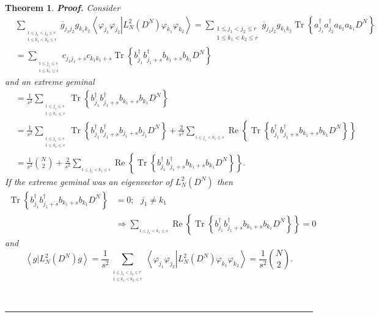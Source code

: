 \documentclass[aps,preprint]{revtex4}%
\newtheorem{theorem}{Theorem}
\newenvironment{proof}[1][Proof]{\noindent\textbf{#1.} }{\ \rule{0.5em}{0.5em}}
\begin{document}
\begin{theorem}
\begin{proof}
Consider
\begin{align}
&  \sum_{_{\substack{1\leq j_{1}<j_{2}\leq r\\1\leq k_{1}<k_{2}\leq r}%
}}\overline{g}_{j_{1}j_{2}}g_{k_{1}k_{2}}\left\langle \left.  \varphi_{j_{1}%
}\varphi_{j_{2}}\right\vert L_{N}^{2}\left(  D^{N}\right)  \varphi_{k_{1}%
}\varphi_{k_{2}}\right\rangle =\sum_{\substack{1\leq j_{1}<j_{2}\leq r\\1\leq
k_{1}<k_{2}\leq r}}\overline{g}_{j_{1}j_{2}}g_{k_{1}k_{2}}\operatorname{Tr}%
\left\{  a_{j_{1}}^{\dagger}a_{j_{2}}^{\dagger}a_{k_{2}}a_{k_{1}}D^{N}\right\}
\\
&  =\sum_{_{\substack{1\leq j_{1}\leq s\\1\leq k_{1}\leq s}}}c_{j_{1}j_{1}%
+s}c_{k_{1}k_{1}+s}\operatorname{Tr}\left\{  b_{j_{1}}^{\dagger}b_{j_{1}%
+s}^{\dagger}b_{k_{1}+s}b_{k_{1}}D^{N}\right\}
\end{align}
and an extreme geminal
\begin{align}
&  =\frac{1}{s^{2}}\sum_{_{\substack{1\leq j_{1}\leq s\\1\leq k_{1}\leq s}%
}}\operatorname{Tr}\left\{  b_{j_{1}}^{\dagger}b_{j_{1}+s}^{\dagger}%
b_{k_{1}+s}b_{k_{1}}D^{N}\right\} \\
&  =\frac{1}{s^{2}}\sum_{_{\substack{1\leq j_{1}\leq s\\1\leq k_{1}\leq s}%
}}\operatorname{Tr}\left\{  b_{j_{1}}^{\dagger}b_{j_{1}+s}^{\dagger}%
b_{j_{1}+s}b_{j_{1}}D^{N}\right\}  +\frac{2}{s^{2}}\sum_{_{1\leq j_{1}%
<k_{1}\leq s}}\operatorname{Re}\left\{  \operatorname{Tr}\left\{  b_{j_{1}%
}^{\dagger}b_{j_{1}+s}^{\dagger}b_{k_{1}+s}b_{k_{1}}D^{N}\right\}  \right\} \\
&  =\frac{1}{s^{2}}\binom{N}{2}+\frac{2}{s^{2}}\sum_{_{1\leq j_{1}<k_{1}\leq
s}}\operatorname{Re}\left\{  \operatorname{Tr}\left\{  b_{j_{1}}^{\dagger
}b_{j_{1}+s}^{\dagger}b_{k_{1}+s}b_{k_{1}}D^{N}\right\}  \right\}  .
\end{align}
If the extreme geminal was an eigenvector of $L_{N}^{2}\left(  D^{N}\right)  $
then
\begin{align}
\operatorname{Tr}\left\{  b_{j_{1}}^{\dagger}b_{j_{1}+s}^{\dagger}b_{k_{1}%
+s}b_{k_{1}}D^{N}\right\}   &  =0;\text{ }j_{1}\neq k_{1}\\
&  \Rightarrow\sum_{_{1\leq j_{1}<k_{1}\leq s}}\operatorname{Re}\left\{
\operatorname{Tr}\left\{  b_{j_{1}}^{\dagger}b_{j_{1}+s}^{\dagger}b_{k_{1}%
+s}b_{k_{1}}D^{N}\right\}  \right\}  =0
\end{align}
and
\begin{equation}
\left\langle \left.  g\right\vert L_{N}^{2}\left(  D^{N}\right)
g\right\rangle =\frac{1}{s^{2}}\sum_{_{\substack{1\leq j_{1}<j_{2}\leq
r\\1\leq k_{1}<k_{2}\leq r}}}\left\langle \left.  \varphi_{j_{1}}%
\varphi_{j_{2}}\right\vert L_{N}^{2}\left(  D^{N}\right)  \varphi_{k_{1}%
}\varphi_{k_{2}}\right\rangle =\frac{1}{s^{2}}\binom{N}{2}.
\end{equation}

\end{proof}
\end{theorem}
\end{document}
